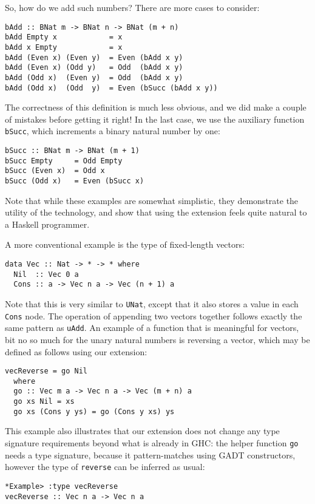 \documentclass{sigplanconf}
\begin{document}
So, how do we add such numbers?  There are more cases to
consider:
\begin{Verbatim}
bAdd :: BNat m -> BNat n -> BNat (m + n)
bAdd Empty x            = x
bAdd x Empty            = x
bAdd (Even x) (Even y)  = Even (bAdd x y)
bAdd (Even x) (Odd y)   = Odd  (bAdd x y)
bAdd (Odd x)  (Even y)  = Odd  (bAdd x y)
bAdd (Odd x)  (Odd  y)  = Even (bSucc (bAdd x y))
\end{Verbatim}
The correctness of this definition is much less obvious,
and we did make a couple of mistakes before getting it
right!  In the last case, we use the auxiliary function
\Verb"bSucc", which increments a binary natural number
by one:
\begin{Verbatim}
bSucc :: BNat m -> BNat (m + 1)
bSucc Empty     = Odd Empty
bSucc (Even x)  = Odd x
bSucc (Odd x)   = Even (bSucc x)
\end{Verbatim}

Note that while these examples are somewhat simplistic,
they demonstrate the utility of the technology, and show that using
the extension feels quite natural to a Haskell programmer.

A more conventional example is the type of fixed-length vectors:
\begin{Verbatim}
data Vec :: Nat -> * -> * where
  Nil  :: Vec 0 a
  Cons :: a -> Vec n a -> Vec (n + 1) a
\end{Verbatim}
Note that this is very similar to \Verb"UNat", except that it also
stores a value in each \Verb"Cons" node.  The operation of appending
two vectors together follows exactly the same pattern as \Verb"uAdd".
An example of a function that is meaningful for vectors, bit no
so much for the unary natural numbers is reversing a vector, which
may be defined as follows using our extension:
\begin{Verbatim}
vecReverse = go Nil
  where
  go :: Vec m a -> Vec n a -> Vec (m + n) a
  go xs Nil = xs
  go xs (Cons y ys) = go (Cons y xs) ys
\end{Verbatim}
This example also illustrates that our extension does not change any type
signature requirements beyond what is already in GHC: the helper
function \Verb"go" needs a type signature, because it pattern-matches
using GADT constructors, however the type of \Verb"reverse" can be
inferred as usual:
\begin{Verbatim}
*Example> :type vecReverse
vecReverse :: Vec n a -> Vec n a
\end{Verbatim}
\end{document}
